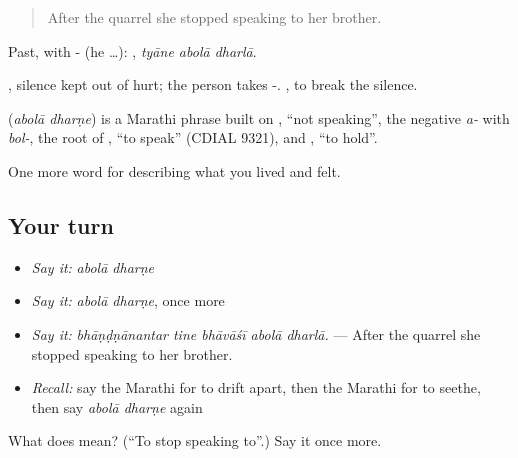 \begin{quote}
After the quarrel she stopped speaking to her brother.
\end{quote}

Past, with - (he …):   , \emph{tyāne abolā dharlā}.

, silence kept out of hurt; the person takes -.  , to break the silence.

\begin{cousinweb}
\textbf{ } (\emph{abolā dharṇe}) is a Marathi phrase built on , \textquotedblleft{}not speaking\textquotedblright{}, the negative \emph{a-} with \emph{bol-}, the root of , \textquotedblleft{}to speak\textquotedblright{} (CDIAL 9321), and , \textquotedblleft{}to hold\textquotedblright{}.
\end{cousinweb}

\begin{grammarlens}[title={What you've built}]
One more word for describing what you lived and felt.
\end{grammarlens}

\subsection*{Your turn}
\begin{itemize}
\raggedright
  \item \emph{Say it:} \emph{abolā dharṇe}
  \item \emph{Say it:} \emph{abolā dharṇe}, once more
  \item \emph{Say it:} \emph{bhāṇḍṇānantar tine bhāvāśī abolā dharlā.} — After the quarrel she stopped speaking to her brother.
  \item \emph{Recall:} say the Marathi for to drift apart, then the Marathi for to seethe, then say \emph{abolā dharṇe} again
\end{itemize}

\begin{tcolorbox}[breakable,colback=teal!4,colframe=teal!35!black,title={Before you move on}]
What does   mean? (\textquotedblleft{}To stop speaking to\textquotedblright{}.) Say it once more.
\end{tcolorbox}
